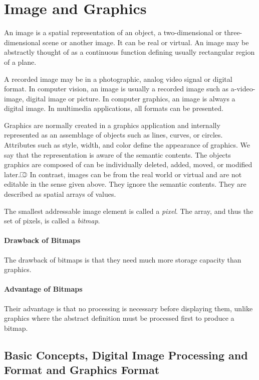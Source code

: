 \chapter{Image and Graphics}
An image is a spatial representation of an object, a two-dimensional or three-dimensional scene or another image. It can be real or virtual. An image may be abstractly thought of as a continuous function defining usually rectangular region of a plane.

A recorded image may be in a photographic, analog video signal or digital format. In computer vision, an image is usually a recorded image such as a-video-image, digital image or picture. In computer graphics, an image is always a digital image. In multimedia applications, all formats can be presented.

Graphics are normally created in a graphics application and internally represented as an assemblage of objects such as lines, curves, or circles. Attributes such as style, width, and color define the appearance of graphics. We say that the representation is aware of the semantic contents. The objects graphics are composed of can be individually deleted, added, moved, or modified later.⎄ In contrast, images can be from the real world or virtual and are not editable in the sense given above. They ignore the semantic contents. They are described as spatial arrays of values. 

The smallest addressable image element is called a \textit{pixel}. The array, and thus the set of pixels, is called a \textit{bitmap}. 

\subsubsection*{Drawback of Bitmaps}
The drawback of bitmaps is that they need much more storage capacity than graphics.

\subsubsection*{Advantage of Bitmaps}
Their advantage is that no processing is necessary before displaying them, unlike graphics where the abstract definition must be processed first to produce a bitmap.

\section{Basic Concepts, Digital Image Processing and Format and Graphics Format}

